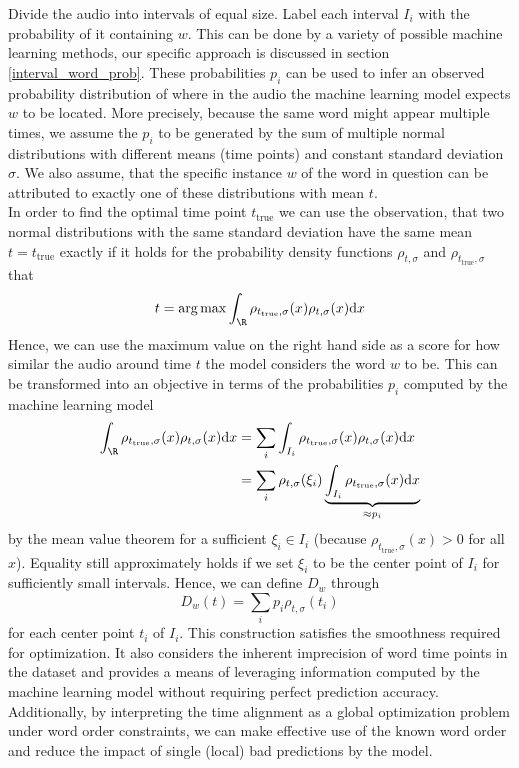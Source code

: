 Divide the audio into intervals of equal size. Label each interval $I_i$ with the probability of it containing $w$. This can be done by a variety of possible machine learning methods, our specific approach is discussed in section \ref{interval_word_prob}. These probabilities $p_i$ can be used to infer an observed probability distribution of where in the audio the machine learning model expects $w$ to be located. More precisely, because the same word might appear multiple times, we assume the $p_i$ to be generated by the sum of multiple normal distributions with different means (time points) and constant standard deviation $\sigma$. We also assume, that the specific instance $w$ of the word in question can be attributed to exactly one of these distributions with mean $t$.\\
In order to find the optimal time point $t_\text{true}$ we can use the observation, that two normal distributions with the same standard deviation have the same mean $t=t_\text{true}$ exactly if it holds for the probability density functions $\rho_{t,\sigma}$ and $\rho_{t_\text{true},\sigma}$ that
\[t = \arg\max \int_\R \rho_{t_\text{true},\sigma}(x)\rho_{t,\sigma}(x)\text{d}x\]
Hence, we can use the maximum value on the right hand side as a score for how similar the audio around time $t$ the model considers the word $w$ to be. This can be transformed into an objective in terms of the probabilities $p_i$ computed by the machine learning model
\begin{align*}
	\int_\R \rho_{t_\text{true},\sigma}(x)\rho_{t,\sigma}(x)\text{d}x &= \sum_{i} \int_{I_i} \rho_{t_\text{true},\sigma}(x)\rho_{t,\sigma}(x)\text{d}x\\
			&= \sum_i \rho_{t,\sigma}(\xi_i) \underbrace{\int_{I_i} \rho_{t_\text{true},\sigma}(x)\text{d}x}_{\approx p_i}
\end{align*}
by the mean value theorem for a sufficient $\xi_i\in I_i$ (because $\rho_{t_\text{true},\sigma}(x) > 0$ for all $x$). Equality still approximately holds if we set $\xi_i$ to be the center point of $I_i$ for sufficiently small intervals.
Hence, we can define $D_w$ through
\[
	D_w(t) = \sum_i p_i \rho_{t,\sigma}(t_i)
\]
for each center point $t_i$ of $I_i$. This construction satisfies the smoothness required for optimization. It also considers the inherent imprecision of word time points in the dataset and provides a means of leveraging information computed by the machine learning model without requiring perfect prediction accuracy.\\
Additionally, by interpreting the time alignment as a global optimization problem under word order constraints, we can make effective use of the known word order and reduce the impact of single (local) bad predictions by the model.

